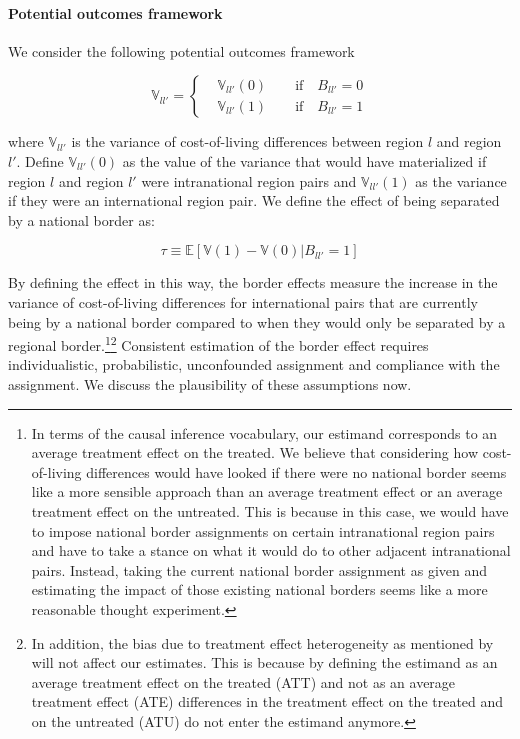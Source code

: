 \paragraph{Potential outcomes framework}    We consider the following potential outcomes framework 
\begin{linenomath*}
    \begin{equation*}
        \mathbb{V}_{ll'} = 
            \begin{cases}
                & \mathbb{V}_{ll'}(0) \qquad \text{if} \quad B_{ll'} = 0 \\
                & \mathbb{V}_{ll'}(1) \qquad \text{if} \quad B_{ll'} = 1
            \end{cases}
    \end{equation*} 
\end{linenomath*}
\noindent where $\mathbb{V}_{ll'}$ is the variance of cost-of-living differences between region $l$ and region $l'$. Define $\mathbb{V}_{ll'}(0)$ as the value of the variance that would have materialized if region $l$ and region $l'$ were intranational region pairs and $\mathbb{V}_{ll'}(1)$ as the variance if they were an international region pair. We define the effect of being separated by a national border as:
\begin{linenomath*}
    \begin{equation}\label{eq:estimand}
        \tau \equiv \mathbb{E}\left[\mathbb{V}(1) - \mathbb{V}(0)|B_{ll'} = 1\right]
    \end{equation}
\end{linenomath*}
\noindent  By defining the effect in this way, the border effects measure the increase in the variance of cost-of-living differences for international pairs that are currently being by a national border compared to when they would only be separated by a regional border.\footnote{In terms of the causal inference vocabulary, our estimand corresponds to an average treatment effect on the treated. We believe that considering how cost-of-living differences would have looked if there were no national border seems like a more sensible approach than an average treatment effect or an average treatment effect on the untreated. This is because in this case, we would have to impose national border assignments on certain intranational region pairs and have to take a stance on what it would do to other adjacent intranational pairs. Instead, taking the current national border assignment as given and estimating the impact of those existing national borders seems like a more reasonable thought experiment.}\footnote{In addition, the bias due to treatment effect heterogeneity as mentioned by \citet{Gorodnichenko2009} will not affect our estimates. This is because by defining the estimand as an average treatment effect on the treated (ATT) and not as an average treatment effect (ATE) differences in the treatment effect on the treated and on the untreated (ATU) do not enter the estimand anymore.} Consistent estimation of the border effect requires individualistic, probabilistic, unconfounded assignment and compliance with the assignment. We discuss the plausibility of these assumptions now. 

